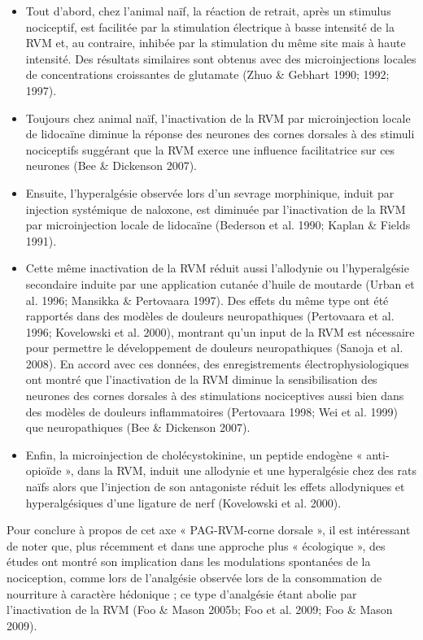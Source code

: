 \documentclass[a4paper,12pt,twoside]{report}
\begin{document}
\begin{itemize}
\item Tout d’abord, chez l’animal naïf, la réaction de retrait, après un stimulus nociceptif, est facilitée par la stimulation électrique à basse intensité de la RVM et, au contraire, inhibée par la stimulation du même site mais à haute intensité. Des résultats similaires sont obtenus avec des microinjections locales de concentrations croissantes de glutamate (Zhuo \& Gebhart 1990; 1992; 1997).
\item Toujours chez animal naïf, l’inactivation de la RVM par microinjection locale de lidocaïne diminue la réponse des neurones des cornes dorsales à des stimuli nociceptifs suggérant que la RVM exerce une influence facilitatrice sur ces neurones (Bee \& Dickenson 2007).
\item Ensuite, l’hyperalgésie observée lors d’un sevrage morphinique, induit par injection systémique de naloxone, est diminuée par l’inactivation de la RVM par microinjection locale de lidocaïne (Bederson et al. 1990; Kaplan \& Fields 1991).
\item Cette même inactivation de la RVM réduit aussi l’allodynie ou l’hyperalgésie secondaire induite par une application cutanée d’huile de moutarde (Urban et al. 1996; Mansikka \& Pertovaara 1997). Des effets du même type ont été rapportés dans des modèles de douleurs neuropathiques (Pertovaara et al. 1996; Kovelowski et al. 2000), montrant qu’un input de la RVM est nécessaire pour permettre le développement de douleurs neuropathiques (Sanoja et al. 2008). En accord avec ces données, des enregistrements électrophysiologiques ont montré que l’inactivation de la RVM diminue la sensibilisation des neurones des cornes dorsales à des stimulations nociceptives aussi bien dans des modèles de douleurs inflammatoires (Pertovaara 1998; Wei et al. 1999) que neuropathiques (Bee \& Dickenson 2007).
\item Enfin, la microinjection de cholécystokinine, un peptide endogène « anti-opioïde », dans la RVM, induit une allodynie et une hyperalgésie chez des rats naïfs alors que l’injection de son antagoniste réduit les effets allodyniques et hyperalgésiques d’une ligature de nerf (Kovelowski et al. 2000).
\end{itemize}

\bigskip

Pour conclure à propos de cet axe « PAG-RVM-corne dorsale », il est intéressant de noter que, plus récemment et dans une approche plus « écologique », des études ont montré son implication dans les modulations spontanées de la nociception, comme lors de l’analgésie observée lors de la consommation de nourriture à caractère hédonique ; ce type d’analgésie étant abolie par l’inactivation de la RVM (Foo \& Mason 2005b; Foo et al. 2009; Foo \& Mason 2009).
\end{document}

